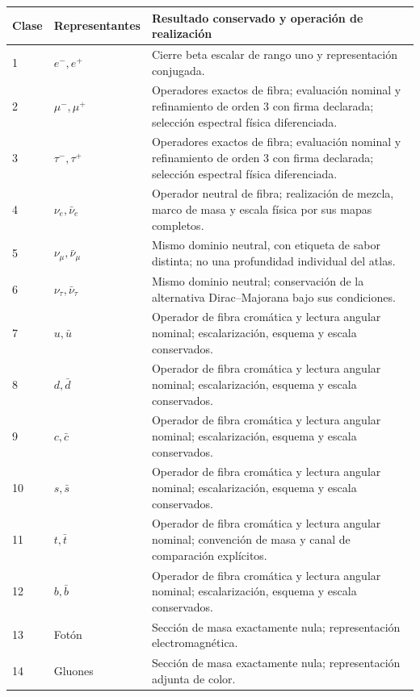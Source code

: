 \begin{table}[!htbp]
\centering\fontsize{9.2}{10.5}\selectfont
\setlength{\tabcolsep}{4pt}\renewcommand{\arraystretch}{1.04}
\begin{tabular}{@{}p{.11\linewidth}p{.20\linewidth}p{.62\linewidth}@{}}
 \toprule
 Clase&Representantes&Resultado conservado y operación de realización\\
 \midrule
 
 1&\(e^-,e^+\)&Cierre beta escalar de rango uno y representación conjugada.\\
 2&\(\mu^-,\mu^+\)&Operadores exactos de fibra; evaluación nominal y refinamiento de orden \(3\) con firma declarada; selección espectral física diferenciada.\\
 3&\(\tau^-,\tau^+\)&Operadores exactos de fibra; evaluación nominal y refinamiento de orden \(3\) con firma declarada; selección espectral física diferenciada.\\
 4&\(\nu_e,\bar\nu_e\)&Operador neutral de fibra; realización de mezcla, marco de masa y escala física por sus mapas completos.\\
 5&\(\nu_\mu,\bar\nu_\mu\)&Mismo dominio neutral, con etiqueta de sabor distinta; no una profundidad individual del atlas.\\
 6&\(\nu_\tau,\bar\nu_\tau\)&Mismo dominio neutral; conservación de la alternativa Dirac--Majorana bajo sus condiciones.\\
 7&\(u,\bar u\)&Operador de fibra cromática y lectura angular nominal; escalarización, esquema y escala conservados.\\
 8&\(d,\bar d\)&Operador de fibra cromática y lectura angular nominal; escalarización, esquema y escala conservados.\\
 9&\(c,\bar c\)&Operador de fibra cromática y lectura angular nominal; escalarización, esquema y escala conservados.\\
 10&\(s,\bar s\)&Operador de fibra cromática y lectura angular nominal; escalarización, esquema y escala conservados.\\
 11&\(t,\bar t\)&Operador de fibra cromática y lectura angular nominal; convención de masa y canal de comparación explícitos.\\
 12&\(b,\bar b\)&Operador de fibra cromática y lectura angular nominal; escalarización, esquema y escala conservados.\\
 13&Fotón&Sección de masa exactamente nula; representación electromagnética.\\
 14&Gluones&Sección de masa exactamente nula; representación adjunta de color.\\

\end{tabular}
\end{table}
